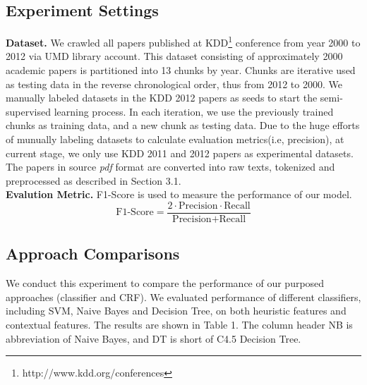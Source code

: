 \documentclass[10pt]{article}
\begin{document}
\subsection{Experiment Settings}
\textbf{Dataset.} We crawled all papers published at KDD\footnote{http://www.kdd.org/conferences} conference from year 2000 to 2012 via UMD library account. This dataset consisting of approximately 2000 academic papers is partitioned into 13 chunks by year. Chunks are iterative used as testing data in the reverse chronological order, thus from 2012 to 2000. We manually labeled datasets in the KDD 2012 papers as seeds to start the semi-supervised learning process. In each iteration, we use the previously trained chunks as training data, and a new chunk as testing data. Due to the huge efforts of munually labeling datasets to calculate evaluation metrics(i.e, precision), at current stage, we only use KDD 2011 and 2012 papers as experimental datasets. The papers in source \emph{pdf} format are converted into raw texts, tokenized and preprocessed as described in Section 3.1. \\
\textbf{Evalution Metric.} F1-Score is used to measure the performance of our model. 
\[
	\text{F1-Score} = \frac{2 \cdot \text{Precision} \cdot \text{Recall}}{\text{Precision} + \text{Recall}}
\]

\subsection{Approach Comparisons}
We conduct this experiment to compare the performance of our purposed approaches (classifier and CRF). We evaluated performance of different classifiers, including SVM, Naive Bayes and Decision Tree, on both heuristic features and contextual features. The results are shown in Table 1. The column header NB is abbreviation of Naive Bayes, and DT is short of C4.5 Decision Tree.
\end{document}
